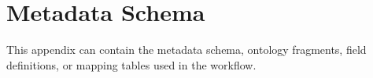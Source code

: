 \chapter{Metadata Schema}
\label{app:schema}

This appendix can contain the metadata schema, ontology fragments, field definitions, or mapping tables used in the workflow.
